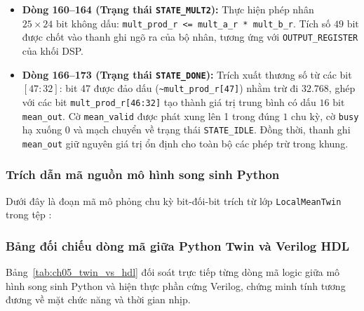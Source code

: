 \begin{itemize}[leftmargin=1.5em, itemsep=3pt]
    \item \textbf{Dòng 160--164 (Trạng thái \texttt{STATE\_MULT2}):} Thực hiện phép nhân $25 \times 24\text{ bit}$ không dấu:
    \texttt{mult\_prod\_r <= mult\_a\_r * mult\_b\_r}. Tích số $49\text{ bit}$ được chốt vào thanh ghi ngõ ra của bộ nhân, tương ứng với \texttt{OUTPUT\_REGISTER} của khối DSP.
    \item \textbf{Dòng 166--173 (Trạng thái \texttt{STATE\_DONE}):} Trích xuất thương số từ các bit $[47:32]$: bit 47 được đảo dấu (\texttt{\~{}mult\_prod\_r[47]}) nhằm trừ đi $32.768$, ghép với các bit \texttt{mult\_prod\_r[46:32]} tạo thành giá trị trung bình có dấu $16\text{ bit}$ \texttt{mean\_out}. Cờ \texttt{mean\_valid} được phát xung lên 1 trong đúng $1\text{ chu kỳ}$, cờ \texttt{busy} hạ xuống 0 và mạch chuyển về trạng thái \texttt{STATE\_IDLE}. Đồng thời, thanh ghi \texttt{mean\_out} giữ nguyên giá trị ổn định cho toàn bộ các phép trừ trong khung.
\end{itemize}

\subsubsection*{Trích dẫn mã nguồn mô hình song sinh Python}
Dưới đây là đoạn mã mô phỏng chu kỳ bit-đối-bit trích từ lớp \texttt{LocalMeanTwin} trong tệp :



\subsubsection*{Bảng đối chiếu dòng mã giữa Python Twin và Verilog HDL}
Bảng~\ref{tab:ch05_twin_vs_hdl} đối soát trực tiếp từng dòng mã logic giữa mô hình song sinh Python và hiện thực phần cứng Verilog, chứng minh tính tương đương về mặt chức năng và thời gian nhịp.

